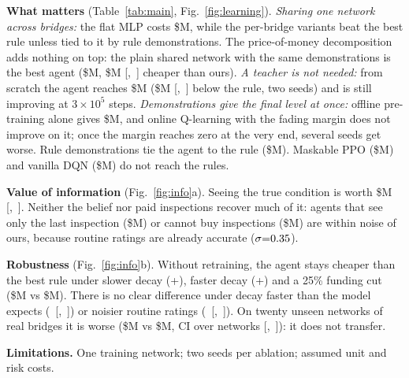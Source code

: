 \documentclass[conference,10pt]{IEEEtran}
\begin{document}
\textbf{What matters} (Table~\ref{tab:main}, Fig.~\ref{fig:learning}). \emph{Sharing one network across
bridges:} the flat MLP costs \$\FlatCost M, while the per-bridge variants beat the best rule unless
tied to it by rule demonstrations. The price-of-money decomposition adds nothing on top: the plain shared network with the same
demonstrations is the best agent (\$\SharedCost M, \$\SharedGap M \mbox{[\SharedGapLo, \SharedGapHi]}
cheaper than ours). \emph{A teacher is not needed:} from scratch the agent reaches \$\NoDemoCost M
(\$\NoDemoSeedSaveRule M \mbox{[\NoDemoSeedSaveRuleLo, \NoDemoSeedSaveRuleHi]} below the rule, two seeds)
and is still improving at $3{\times}10^5$ steps. \emph{Demonstrations give the final level at once:}
offline pre-training alone gives \$\PretrainCost M, and online Q-learning with the fading margin does not
improve on it; once the margin reaches zero at the very end, several seeds get worse. Rule demonstrations tie the agent to the rule (\$\RuleDemoCost M). Maskable PPO
(\$\PPOCost M) and vanilla DQN (\$\VanillaCost M) do not reach the rules.

\textbf{Value of information} (Fig.~\ref{fig:info}a). Seeing the true condition is worth \$\OracleGap M
\mbox{[\OracleGapLo, \OracleGapHi]}. Neither the belief nor paid inspections recover much of it: agents
that see only the last inspection (\$\LastObsCost M) or cannot buy inspections (\$\NoInspCost M) are
within noise of ours, because routine ratings are already accurate ($\sigma{=}0.35$).

\textbf{Robustness} (Fig.~\ref{fig:info}b). Without retraining, the agent stays cheaper than the best rule under slower decay (+\SlowSaving), faster decay (+\FastSaving) and a 25\% funding cut
(\$\CutOurs M vs \$\CutRule M). There is no clear difference under decay faster than the model expects
(\UnmodSaving\ \mbox{[\UnmodLo, \UnmodHi]}) or noisier routine ratings
(\NoisySaving\ \mbox{[\NoisyLo, \NoisyHi]}). On twenty unseen networks of real bridges it is worse
(\$\UnseenOurs M vs \$\UnseenRule M, CI over networks \mbox{[\UnseenLo, \UnseenHi]}): it does not
transfer.


\textbf{Limitations.} One training network; two seeds per ablation; assumed unit and risk costs.
\end{document}
